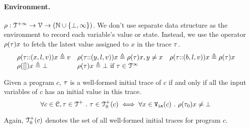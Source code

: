 \paragraph{Environment.} $\rho : {\mathcal{T}^{+\infty}}  \to \mathcal{V} \to(\mathbb{N} \cup \{\bot, \infty\})$.  
We don't use separate data structure as the environment to record each variable's value or state. Instead, we use the operator $\rho (\mathtt{\tau}) x$ to fetch the latest value assigned to $x$ in the trace $\mathtt{\tau}$. 
\[
\begin{array}{lll}
\rho(\mathtt{\tau}  {\small ::} (x, l, v)) x \triangleq v
&
\rho(\mathtt{\tau} {\small ::} (y, l, v)) x \triangleq \rho(\mathtt{\tau}) x, y \neq x
&
\rho(\mathtt{\tau} {\small ::} (b, l, v)) x \triangleq \rho(\mathtt{\tau}) x
\\
\rho({[]} ) x \triangleq \bot
&
\rho(\mathtt{\tau} ) x \triangleq \bot ~ \text{if}~ \mathtt{\tau} \in \mathcal{T}^{\infty}
\end{array}
\]
%
\begin{defn}
  \label{def:initial_trace}
  Given a program $c$, $\mathtt{\tau}$ is a well-formed initial trace of $c$ if and only if all the input variables of $c$ has an initial value in this trace.
  \[
    \forall c \in \mathcal{C}, \mathtt{\tau} \in \mathcal{T}^{+} ~.~ \mathtt{\tau} \in \mathcal{T}^{+}_0(c) \iff 
    \forall x \in {\ensuremath{\mathtt{V_{\mathtt{in}}}}}(c) ~.~ \rho(\mathtt{\tau}_0) x \neq \bot
    \]
\end{defn}
%
Again, $\mathcal{T}^{+}_0(c)$ denotes the set of all well-formed initial traces for program $c$.
%
